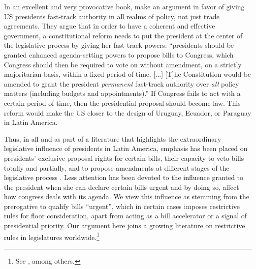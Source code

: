 In an excellent and very provocative book, \citet[][:145]{howell.moe.Relic2016} make an argument in favor of giving US presidents fast-track authority in all realms of policy, not just trade agreements. They argue that in order to have a coherent and effective government, a constitutional reform needs to put the president at the center of the legislative process by giving her fast-track powers: ``presidents should be granted enhanced agenda-setting powers to propose bills to Congress, which Congress should then be required to vote on without amendment, on a strictly majoritarian basis, within a fixed period of time. [...] [T]he Constitution would be amended to grant the president \emph{permanent} fast-track authority over \emph{all} policy matters (including budgets and appointments).'' If Congress fails to act with a certain period of time, then the presidential proposal should become law. This reform would make the US closer to the design of Uruguay, Ecuador, or Paraguay in Latin America. 

Thus, in all and as part of a literature that highlights the extraordinary legislative influence of presidents in Latin America, emphasis has been placed on presidents' exclusive proposal rights for certain bills, their capacity to veto bills totally and partially, and to propose amendments at different stages of the legislative process \citep{carey.shugart.1998,baldez.carey.1999,aleman.navia.UrgChi.2009,tsebelis.aleman.2005}. Less attention has been devoted to the influence granted to the president when she can declare certain bills urgent and by doing so, affect how congress deals with its agenda. We view this influence as stemming from the prerogative to qualify bills ``urgent'', which in certain cases imposes restrictive rules for floor consideration, apart from acting as a bill accelerator or a signal of presidential priority. Our argument here joins a growing literature on restrictive rules in legislatures worldwide.\footnote{See \citet{dion.huber.1996,doring.restrictiveRules.2003,huber.1996a,krehbielRestrictiveRules1997,heller.2001,weingast.1992,schickler.richRules1997,cox.mccubbins.1997,amorim.cox.mccubbins.2003,calvo.2014argBook,sin.2014,denhartog.2004phd}, among others.} 
